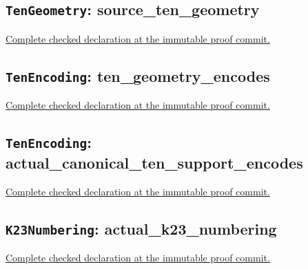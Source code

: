

\subsection*{\texttt{TenGeometry}: source\_ten\_geometry}

\noindent\href{https://github.com/alectionary/vibe-math/blob/3ae21c0719cedbd928f4f7882f9b9e266567605e/formalization/distance-preservation/truncated12/TenGeometry.lean#L26-L87}{Complete checked declaration at the immutable proof commit.}



\subsection*{\texttt{TenEncoding}: ten\_geometry\_encodes}

\noindent\href{https://github.com/alectionary/vibe-math/blob/3ae21c0719cedbd928f4f7882f9b9e266567605e/formalization/distance-preservation/truncated12/TenEncoding.lean#L8-L38}{Complete checked declaration at the immutable proof commit.}



\subsection*{\texttt{TenEncoding}: actual\_canonical\_ten\_support\_encodes}

\noindent\href{https://github.com/alectionary/vibe-math/blob/3ae21c0719cedbd928f4f7882f9b9e266567605e/formalization/distance-preservation/truncated12/TenEncoding.lean#L40-L52}{Complete checked declaration at the immutable proof commit.}



\subsection*{\texttt{K23Numbering}: actual\_k23\_numbering}

\noindent\href{https://github.com/alectionary/vibe-math/blob/3ae21c0719cedbd928f4f7882f9b9e266567605e/formalization/distance-preservation/truncated12/K23Numbering.lean#L29-L74}{Complete checked declaration at the immutable proof commit.}

